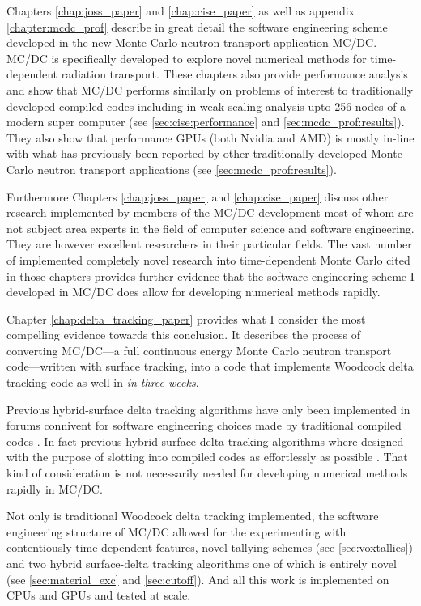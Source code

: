 Chapters \ref{chap:joss_paper} and \ref{chap:cise_paper} as well as appendix \ref{chapter:mcdc_prof} describe in great detail the software engineering scheme developed in the new Monte Carlo neutron transport application MC/DC.
MC/DC is specifically developed to explore novel numerical methods for time-dependent radiation transport.
These chapters also provide performance analysis and show that MC/DC performs similarly on problems of interest to traditionally developed compiled codes including in weak scaling analysis upto 256 nodes of a modern super computer (see \ref{sec:cise:performance} and \ref{sec:mcdc_prof:results}).
They also show that performance GPUs (both Nvidia and AMD) is mostly in-line with what has previously been reported by other traditionally developed Monte Carlo neutron transport applications (see \ref{sec:mcdc_prof:results}).

Furthermore Chapters \ref{chap:joss_paper} and \ref{chap:cise_paper} discuss other research implemented by members of the MC/DC development most of whom are not subject area experts in the field of computer science and software engineering.
They are however excellent researchers in their particular fields.
The vast number of implemented completely novel research into time-dependent Monte Carlo cited in those chapters provides further evidence that the software engineering scheme I developed in MC/DC does allow for developing numerical methods rapidly.

Chapter \ref{chap:delta_tracking_paper} provides what I consider the most compelling evidence towards this conclusion.
It describes the process of converting MC/DC---a full continuous energy Monte Carlo neutron transport code---written with surface tracking, into a code that implements Woodcock delta tracking code as well in \emph{in three weeks}.

Previous hybrid-surface delta tracking algorithms have only been implemented in forums connivent for software engineering choices made by traditional compiled codes \cite{leppanen_development_2013conf}.
In fact previous hybrid surface delta tracking algorithms where designed with the purpose of slotting into compiled codes as effortlessly as possible \cite{morgan2023delta}.
That kind of consideration is not necessarily needed for developing numerical methods rapidly in MC/DC.

Not only is traditional Woodcock delta tracking implemented, the software engineering structure of MC/DC allowed for the experimenting with contentiously time-dependent features, novel tallying schemes (see \ref{sec:voxtallies}) and two hybrid surface-delta tracking algorithms one of which is entirely novel (see \ref{sec:material_exc} and \ref{sec:cutoff}).
And all this work is implemented on CPUs and GPUs and tested at scale.

